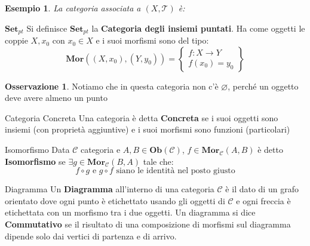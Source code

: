 \documentclass[11pt,a4paper,twoside]{article}
\newtheorem{es}{Esempio}
\theoremstyle{definition}
\newtheorem*{oss}{Osservazione}
\begin{document}
\begin{es}
	La categoria associata a $(X, \mathcal T)$ è:
	\begin{center}
	\end{center}
\end{es}

\begin{defn}{$\bm{Set}_{pt}$}{}
	Si definisce $\bm{Set}_{pt}$ la \textbf{Categoria degli insiemi puntati}. Ha come oggetti le coppie $X, x_0$ con $x_0 \in X$ e i suoi morfismi sono del tipo:
	\[\bm{Mor}((X, x_0), (Y, y_0)) = \left.\begin{cases} f: X \to Y\\ f(x_0) = y_0 \end{cases}\right\}\]
\end{defn}

\begin{oss}
	Notiamo che in questa categoria non c'è $\varnothing$, perché un oggetto deve avere almeno un punto
\end{oss}

\begin{defn}{Categoria Concreta}{}
	Una categoria è detta \textbf{Concreta} se i suoi oggetti sono insiemi (con proprietà aggiuntive) e i suoi morfismi sono funzioni (particolari)
\end{defn}

\begin{defn}{Isomorfismo}{}
	Data $\mathcal C$ categoria e $A, B \in \bm{Ob}(\mathcal C)$, $f \in \bm{Mor}_\mathcal C(A, B)$ è detto \textbf{Isomorfismo} se $\exists g \in \bm{Mor}_\mathcal C(B, A)$ tale che:
	\[ f \circ g \text { e } g \circ f \text{ siano le identità nel posto giusto} \]
\end{defn}

\begin{defn}{Diagramma}{}
	Un \textbf{Diagramma} all'interno di una categoria $\mathcal C$ è il dato di un grafo orientato dove ogni punto è etichettato usando gli oggetti di $\mathcal C$ e ogni freccia è etichettata con un morfismo tra i due oggetti.
	Un diagramma si dice \textbf{Commutativo} se il risultato di una composizione di morfismi sul diagramma dipende solo dai vertici di partenza e di arrivo.
\end{defn}
\end{document}
